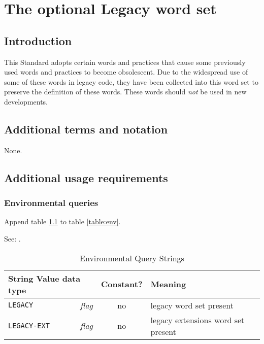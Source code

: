 \chapter{The optional Legacy word set} %
\cbstart

\section{Introduction} %

This Standard adopts certain words and practices that cause
some previously used words and practices to become obsolescent.
Due to the widespread use of some of these words in legacy code,
they have been collected into this word set to preserve the
definition of these words.  These words should \emph{not} be
used in new developments.

\section{Additional terms and notation} %

None.

\section{Additional usage requirements} %

\subsection{Environmental queries} %

Append table \ref{legacy:env} to table \ref{table:env}.

See: .

\begin{table}[ht]
  \begin{center}
	\caption{Environmental Query Strings}
	\label{legacy:env}
	\begin{tabular}{p{9em}rcp{}}
		\hline\hline
		\multicolumn{2}{l}{String \hfill Value data type} & Constant? & Meaning \\
		\hline
		\texttt{LEGACY}		& \emph{flag}	& no	&
			legacy word set present \\
		\texttt{LEGACY-EXT}	& \emph{flag}	& no	&
			legacy extensions word set present \\
		\hline\hline
	\end{tabular}
  \end{center}
\end{table}

